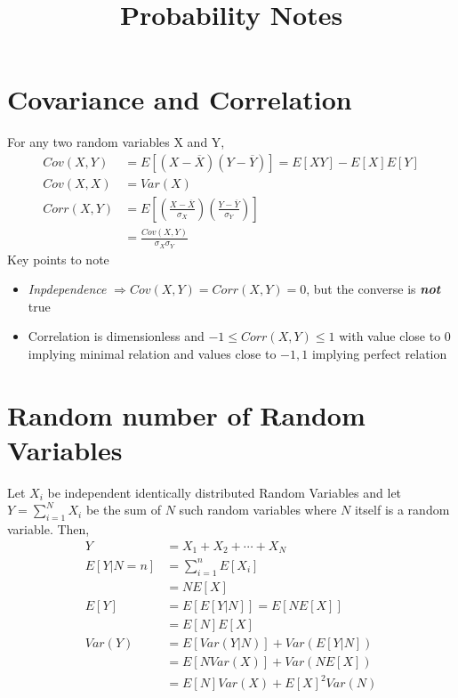 \documentclass[11pt, a4paper]{article}
\title{Probability Notes}
\begin{document}
    \maketitle{}
    \tableofcontents
    \newpage

    



    \section{Covariance and Correlation}
    For any two random variables X and Y,
    \begin{align*}
        Cov(X,Y) &= E[(X - \overline{X})(Y - \overline{Y})] = E[XY] - E[X]E[Y]\\
        Cov(X,X) &= Var(X)\\
        Corr(X,Y) &= E[(\frac{X - \overline{X}}{\sigma_{X}}) (\frac{Y - \overline{Y}}{\sigma_{Y}})]\\
        &= \frac{Cov(X,Y)}{\sigma_{X} \sigma_{Y}}
    \end{align*}
    Key points to note
    \begin{itemize}
        \item \emph{Inpdependence} $\Rightarrow Cov(X,Y) = Corr(X,Y) = 0$, but the converse is \emph{\textbf{not}} true
        \item Correlation is dimensionless and $-1 \leq Corr(X,Y) \leq 1$ with value close to $0$ implying minimal relation and values close to $-1, 1$ implying perfect relation
    \end{itemize}

    

    \section{Random number of Random Variables}
    Let $X_{i}$ be independent identically distributed Random Variables and let $Y = \sum_{i=1}^{N} X_{i}$ be the sum of $N$ such random variables where $N$ itself is a random variable. Then,
    \begin{align*}
        Y &= X_{1} + X_{2} + \cdots + X_{N}\\
        E[Y|N=n] &= \sum_{i=1}^{n}E[X_{i}]\\
                &= NE[X]\\
        E[Y] &= E[E[Y|N]] = E[NE[X]]\\
            &= E[N]E[X] \tag*{since $E[X]$ will be a number}\\
        Var(Y) &= E[Var(Y|N)] + Var(E[Y|N])\\
            &= E[NVar(X)] + Var(NE[X])\\
            &= E[N]Var(X) + E[X]^{2}Var(N)
    \end{align*}
\end{document}
